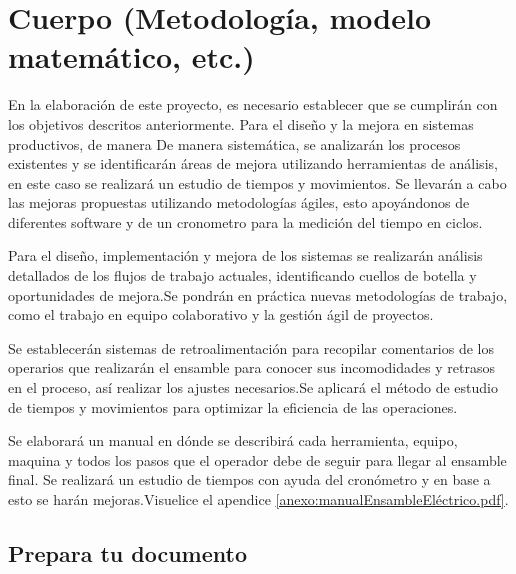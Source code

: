     
    \section{Cuerpo (Metodología, modelo matemático, etc.)}
    
    
    
    
    En la elaboración de este proyecto, es necesario establecer que se cumplirán con los objetivos descritos anteriormente. Para el diseño y la mejora en sistemas productivos, de manera De manera sistemática, se analizarán los procesos existentes y se identificarán áreas de mejora utilizando herramientas de análisis, en este caso se realizará un estudio de tiempos y movimientos. Se llevarán a cabo las mejoras propuestas utilizando metodologías ágiles, esto apoyándonos de diferentes software y de un cronometro para la medición del tiempo en ciclos.
    
    
    Para el diseño, implementación y mejora de los sistemas se realizarán análisis detallados de los flujos de trabajo actuales, identificando cuellos de botella y oportunidades de mejora.Se pondrán en práctica nuevas metodologías de trabajo, como el trabajo en equipo colaborativo y la gestión ágil de proyectos.
    
    
    Se establecerán sistemas de retroalimentación para recopilar comentarios de los operarios que realizarán el ensamble para conocer sus incomodidades y retrasos en el proceso, así realizar los ajustes necesarios.Se aplicará el método de estudio de tiempos y movimientos para optimizar la eficiencia de las operaciones.
    
    Se elaborará un manual en dónde se describirá cada herramienta, equipo, maquina y todos los pasos que el operador debe de seguir para llegar al ensamble final. Se realizará un estudio de tiempos con ayuda del cronómetro y en base a esto se harán mejoras.Visuelice el apendice \ref{anexo:manualEnsambleEléctrico.pdf}.
    
    
    

    

    
    \subsection{Prepara tu documento}
    
    
